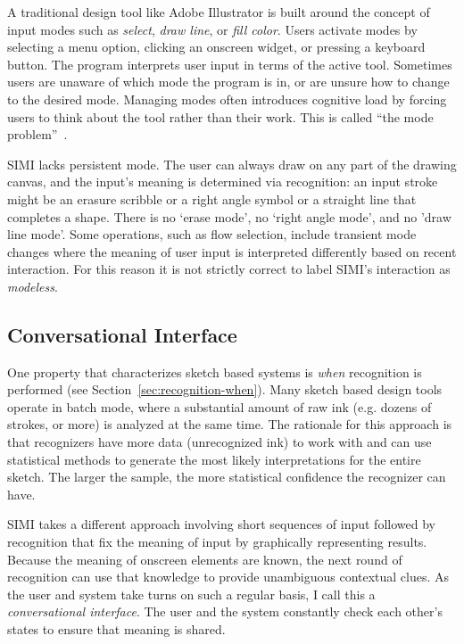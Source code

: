 A traditional design tool like Adobe Illustrator is built around the
concept of input modes such as \textit{select}, \textit{draw line}, or
\textit{fill color}. Users activate modes by selecting a menu option,
clicking an onscreen widget, or pressing a keyboard button. The
program interprets user input in terms of the active tool. Sometimes
users are unaware of which mode the program is in, or are unsure how
to change to the desired mode. Managing modes often introduces
cognitive load by forcing users to think about the tool rather than
their work. This is called ``the mode
problem''~\cite{tesler-mode-problem}.

SIMI lacks persistent mode. The user can always draw on any part of
the drawing canvas, and the input's meaning is determined via
recognition: an input stroke might be an erasure scribble or a right
angle symbol or a straight line that completes a shape. There is no
`erase mode', no `right angle mode', and no 'draw line mode'. Some
operations, such as flow selection, include transient mode changes
where the meaning of user input is interpreted differently based on
recent interaction. For this reason it is not strictly correct to
label SIMI's interaction as \textit{modeless}.

\subsection{Conversational Interface}

One property that characterizes sketch based systems is \textit{when}
recognition is performed (see
Section~\ref{sec:recognition-when}). Many sketch based design tools
operate in batch mode, where a substantial amount of raw ink
(e.g. dozens of strokes, or more) is analyzed at the same time. The
rationale for this approach is that recognizers have more data
(unrecognized ink) to work with and can use statistical methods to
generate the most likely interpretations for the entire sketch. The
larger the sample, the more statistical confidence the recognizer can
have.

SIMI takes a different approach involving short sequences of input
followed by recognition that fix the meaning of input by graphically
representing results. Because the meaning of onscreen elements are
known, the next round of recognition can use that knowledge to provide
unambiguous contextual clues. As the user and system take turns on
such a regular basis, I call this a \textit{conversational
  interface}. The user and the system constantly check each other's
states to ensure that meaning is shared.

